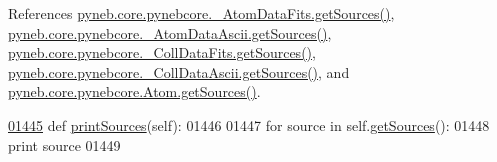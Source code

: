 References \hyperlink{pynebcore_8py_source_l00183}{pyneb.\+core.\+pynebcore.\+\_\+\+Atom\+Data\+Fits.\+get\+Sources()}, \hyperlink{pynebcore_8py_source_l00448}{pyneb.\+core.\+pynebcore.\+\_\+\+Atom\+Data\+Ascii.\+get\+Sources()}, \hyperlink{pynebcore_8py_source_l00673}{pyneb.\+core.\+pynebcore.\+\_\+\+Coll\+Data\+Fits.\+get\+Sources()}, \hyperlink{pynebcore_8py_source_l01003}{pyneb.\+core.\+pynebcore.\+\_\+\+Coll\+Data\+Ascii.\+get\+Sources()}, and \hyperlink{pynebcore_8py_source_l01450}{pyneb.\+core.\+pynebcore.\+Atom.\+get\+Sources()}.


\begin{DoxyCode}
\hypertarget{classpyneb_1_1core_1_1pynebcore_1_1_atom_l01445}{}\hyperlink{classpyneb_1_1core_1_1pynebcore_1_1_atom_af603fa94afcc5893bc55a72cafc3fdd5}{01445}     \textcolor{keyword}{def }\hyperlink{classpyneb_1_1core_1_1pynebcore_1_1_atom_af603fa94afcc5893bc55a72cafc3fdd5}{printSources}(self):
01446         
01447         \textcolor{keywordflow}{for} source \textcolor{keywordflow}{in} self.\hyperlink{classpyneb_1_1core_1_1pynebcore_1_1_atom_a9d6390b03ff490938536167fe65d8a87}{getSources}():
01448             \textcolor{keywordflow}{print} source    
01449     
\end{DoxyCode}
\hypertarget{classpyneb_1_1core_1_1pynebcore_1_1_atom_a0b95239f3b76bbd0e42da220370ff866}{}
